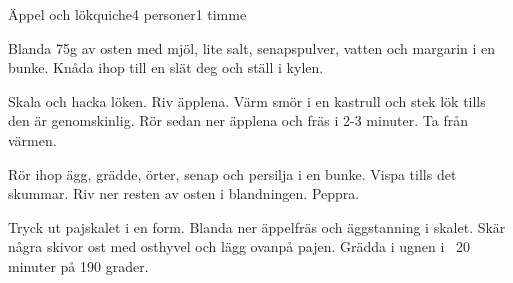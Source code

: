 \documentclass[a4wide, 10pt]{article}
\begin{document}
\begin{recipe}{Äppel och lökquiche}{4 personer}{1 timme}


Blanda 75g av osten med mjöl, lite salt, senapspulver, vatten och
margarin i en bunke. Knåda ihop till en slät deg och ställ i kylen.


Skala och hacka löken. Riv äpplena. Värm smör i en kastrull och stek
lök tills den är genomskinlig. Rör sedan ner äpplena och fräs i 2-3
minuter. Ta från värmen.


Rör ihop ägg, grädde, örter, senap och persilja i en bunke. Vispa
tills det skummar. Riv ner resten av osten i blandningen. Peppra.
\end{recipe}

Tryck ut pajskalet i en form. Blanda ner äppelfräs och äggstanning i
skalet. Skär några skivor ost med osthyvel och lägg ovanpå
pajen. Grädda i ugnen i ~20 minuter på 190 grader.
\end{document}
